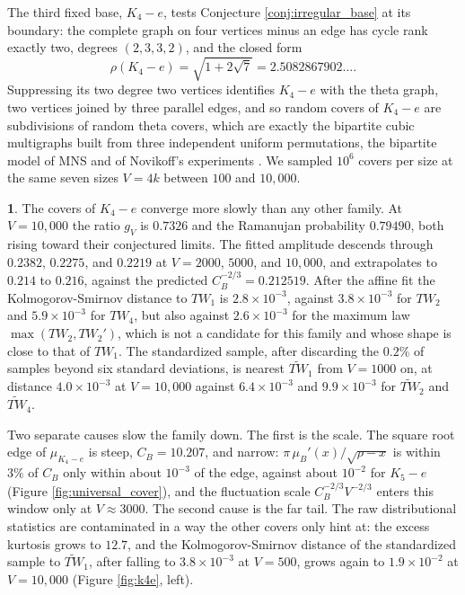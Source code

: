 \documentclass[12pt,oneside,english]{amsart}
\numberwithin{equation}{section}
\numberwithin{figure}{section}
\numberwithin{table}{section}
\theoremstyle{plain}
\numberwithin{thm}{section}
\theoremstyle{plain}
\theoremstyle{plain}
\theoremstyle{plain}
\theoremstyle{definition}
\theoremstyle{definition}
\newtheorem{numresult}[thm]{\protect\numresultname}
\theoremstyle{definition}
\theoremstyle{remark}
\providecommand{\numresultname}{Numerical Result}
\begin{document}
The third fixed base, $K_{4}-e$, tests Conjecture \ref{conj:irregular_base}
at its boundary: the complete graph on four vertices minus an edge
has cycle rank exactly two, degrees $\left(2,3,3,2\right)$, and the
closed form
\[
\rho(K_{4}-e)=\sqrt{1+2\sqrt{7}}=2.5082867902\dots.
\]
Suppressing its two degree two vertices identifies $K_{4}-e$ with
the theta graph, two vertices joined by three parallel edges, and
so random covers of $K_{4}-e$ are subdivisions of random theta covers,
which are exactly the bipartite cubic multigraphs built from three
independent uniform permutations, the bipartite model of MNS and of
Novikoff's experiments \cite{Novikoff2002}. We sampled $10^{6}$
covers per size at the same seven sizes $V=4k$ between $100$ and
$10{,}000$.
\begin{numresult}
\label{nr:k4e}The covers of $K_{4}-e$ converge more slowly than any
other family. At $V=10{,}000$ the ratio $g_{V}$ is $0.7326$ and
the Ramanujan probability $0.79490$, both rising toward their conjectured
limits. The fitted amplitude descends through $0.2382$, $0.2275$,
and $0.2219$ at $V=2000$, $5000$, and $10{,}000$, and extrapolates
to $0.214$ to $0.216$, against the predicted $C_{B}^{-2/3}=0.212519$.
After the affine fit the Kolmogorov-Smirnov distance to $TW_{1}$ is
$2.8\times10^{-3}$, against $3.8\times10^{-3}$ for $TW_{2}$ and
$5.9\times10^{-3}$ for $TW_{4}$, but also against $2.6\times10^{-3}$
for the maximum law $\max(TW_{2},TW_{2}')$, which is not a candidate
for this family and whose shape is close to that of $TW_{1}$. The
standardized sample, after discarding the $0.2\%$ of samples beyond
six standard deviations, is nearest $\widetilde{TW}_{1}$ from $V=1000$
on, at distance $4.0\times10^{-3}$ at $V=10{,}000$ against $6.4\times10^{-3}$
and $9.9\times10^{-3}$ for $\widetilde{TW}_{2}$ and $\widetilde{TW}_{4}$.
\end{numresult}
Two separate causes slow the family down. The first is the scale.
The square root edge of $\mu_{K_{4}-e}$ is steep, $C_{B}=10.207$,
and narrow: $\pi\,\mu_{B}'(x)/\sqrt{\rho-x}$ is within $3\%$ of $C_{B}$
only within about $10^{-3}$ of the edge, against about $10^{-2}$
for $K_{5}-e$ (Figure \ref{fig:universal_cover}), and the fluctuation
scale $C_{B}^{-2/3}V^{-2/3}$ enters this window only at $V\approx3000$.
The second cause is the far tail. The raw distributional statistics
are contaminated in a way the other covers only hint at: the excess
kurtosis grows to $12.7$, and the Kolmogorov-Smirnov distance of
the standardized sample to $\widetilde{TW}_{1}$, after falling to
$3.8\times10^{-3}$ at $V=500$, grows again to $1.9\times10^{-2}$
at $V=10{,}000$ (Figure \ref{fig:k4e}, left).
\end{document}
